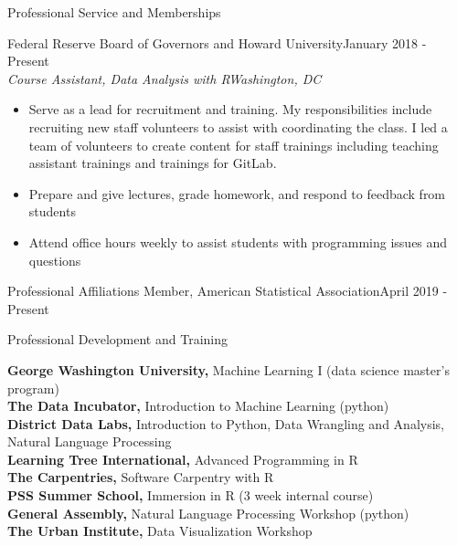 \documentclass{resume} %
\begin{document}
\begin{rSection}{Professional Service and Memberships}

{Federal Reserve Board of Governors and Howard University}\hfill {January 2018 - Present}\\
{\em Course Assistant, Data Analysis with R}\hfill {\em Washington, DC}
\begin{itemize}[leftmargin=*, noitemsep, topsep=0pt]
\item Serve as a lead for recruitment and training. My responsibilities include recruiting new staff volunteers to assist with coordinating the class. I led a team of volunteers to create content for staff trainings including teaching assistant trainings and trainings for GitLab.
\item Prepare and give lectures, grade homework, and respond to feedback from students 
\item Attend office hours weekly to assist students with programming issues and questions 
\end{itemize}



\begin{rSection}{Professional Affiliations}
{Member, American Statistical Association}\hfill {April 2019 - Present}
\end{rSection}




\begin{rSection}{Professional Development and Training}

{\bf George Washington University, } {Machine Learning I (data science master's program)}\\
{\bf The Data Incubator, }{Introduction to Machine Learning (python)}\\
{\bf District Data Labs, } {Introduction to Python, Data Wrangling and Analysis, Natural Language Processing}\\
{\bf Learning Tree International, }{Advanced Programming in R}\\
{\bf The Carpentries, }{Software Carpentry with R}\\
{\bf PSS Summer School, }{Immersion in R (3 week internal course)}\\
{\bf General Assembly, }{Natural Language Processing Workshop (python)}\\
{\bf The Urban Institute, }{Data Visualization Workshop}



\end{rSection}
\end{rSection}
\end{document}
